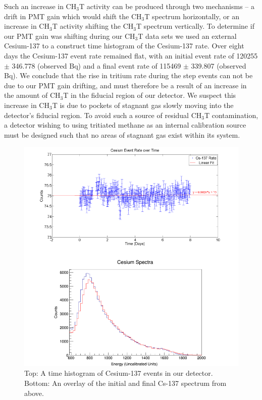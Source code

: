 Such an increase in CH$_3$T activity can be produced through two mechanisms -- a drift in PMT gain which would shift the CH$_3$T spectrum horizontally, or an increase in CH$_3$T activity shifting the CH$_3$T spectrum vertically.  To determine if our PMT gain was shifting during our CH$_3$T data sets we used an external Cesium-137 to a construct time histogram of the Cesium-137 rate.  Over eight days the Cesium-137 event rate remained flat, with an initial event rate of 120255 $\pm$ 346.778 (observed Bq) and a final event rate of 115469 $\pm$ 339.807 (observed Bq). We conclude that the rise in tritium rate during the step events can not be due to our PMT gain drifting, and must therefore be a result of an increase in the amount of CH$_3$T in the fiducial region of our detector.  We suspect this increase in CH$_3$T is due to pockets of stagnant gas slowly moving into the detector's fiducial region.  To avoid such a source of residual CH$_3$T contamination, a detector wishing to using tritiated methane as an internal calibration source must be designed such that no areas of stagnant gas exist within its system.

\begin{figure}[h]
\centering
\includegraphics[scale=0.3]{Cesium_Combined_Fit.png}
\caption{Top: A time histogram of Cesium-137 events in our detector. Bottom: An overlay of the initial and final Cs-137 spectrum from above.}
\label{fig:CsFit}
\end{figure}


